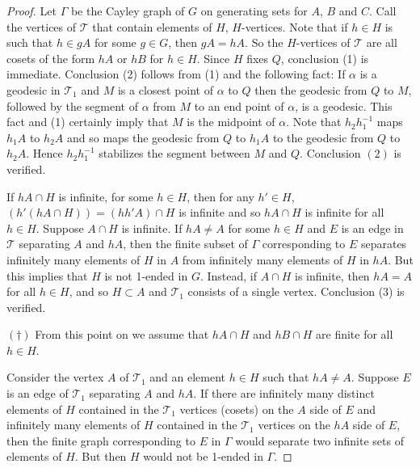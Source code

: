 \documentclass[10pt,a4paper]{amsart}
\begin{document}
\begin{proof}
Let $\Gamma$ be the Cayley graph of $G$ on generating sets for $A$, $B$ and $C$.
Call the vertices of $\mathcal T$ that contain elements of $H$, $H$-vertices. Note that if $h\in H$ is such that $h\in gA$ for some $g\in G$, then $gA=hA$. So the $H$-vertices of $\mathcal T$ are all cosets of the form $hA$ or $hB$ for $h\in H$. 
Since $H$ fixes $Q$, conclusion (1) is immediate. Conclusion (2) follows from (1) and the following fact: If $\alpha$ is a geodesic in $\mathcal T_1$ and $M$ is a closest point of $\alpha$ to $Q$ then the geodesic from $Q$ to $M$, followed by the segment of $\alpha$ from $M$ to an end point of $\alpha$, is a geodesic. This fact and (1) certainly imply that $M$ is the midpoint of $\alpha$. Note that $h_2h_1^{-1}$ maps $h_1A$ to $h_2A$ and so maps the geodesic from $Q$ to $h_1A$ to the geodesic from $Q$ to $h_2A$. Hence $h_2h_1^{-1}$ stabilizes the segment between $M$ and $Q$. Conclusion $(2)$ is verified. 

If $hA\cap H$ is infinite, for some $h\in H$, then for any $h'\in H$, $(h'(hA\cap H))=(hh'A)\cap H$ is infinite and so $hA\cap H$ is infinite for all $h\in H$. Suppose $A\cap H$ is infinite. If $hA\ne A$ for some $h\in H$ and $E$ is an edge in $\mathcal T$ separating $A$ and $hA$, then the finite subset of $\Gamma$ corresponding to $E$ separates infinitely many elements of $H$ in $A$ from infinitely many elements of $H$ in $hA$. But this implies that $H$ is not 1-ended in $G$. Instead, if $A\cap H$ is infinite, then $hA=A$ for all $h\in H$, and so $H\subset A$ and $\mathcal T_1$ consists of a single vertex. Conclusion (3) is verified. 

\medskip

$(\dagger)$ From this point on we assume that $hA\cap H$ and $hB\cap H$ are finite for all $h\in H$. 

\medskip 

Consider the vertex $A$ of $\mathcal T_1$ and an element $h\in H$ such that $hA\ne A$. %
Suppose $E$ is an edge of $\mathcal T_1$ separating $A$ and $hA$. If there are infinitely many distinct elements of $H$ contained in the $\mathcal T_1$ vertices (cosets) on the $A$ side of $E$ and infinitely many elements of $H$ contained in the $\mathcal T_1$ vertices on the $hA$ side of $E$, then the finite graph corresponding to $E$ in $\Gamma$ would separate two infinite sets of elements of $H$. But then $H$ would not be 1-ended in $\Gamma$. 


\end{proof}
\end{document}
